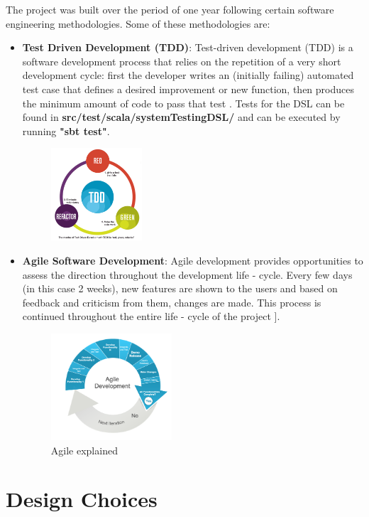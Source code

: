 \documentclass[12pt]{article}
\begin{document}
The project was built over the period of one year following certain software engineering methodologies. Some of these methodologies are:
\begin{itemize}
\item \textbf{Test Driven Development (TDD)}: Test-driven development (TDD) is a software development process that relies on the repetition of a very short development cycle: first the developer writes an (initially failing) automated test case that defines a desired improvement or new function, then produces the minimum amount of code to pass that test \cite{tdd}. Tests for the DSL can be found in \textbf{src/test/scala/systemTestingDSL/} and can be executed by running \textbf{"sbt test"}.

\begin{figure}[H]
  \centering
    \includegraphics[height=130px]{figures/tdd.png}
\end{figure}

\item \textbf{Agile Software Development}: Agile development provides opportunities to assess the direction throughout the development life - cycle. Every few days (in this case 2 weeks), new features are shown to the users and based on feedback and criticism from them, changes are made. This process is continued throughout the entire life - cycle of the project ]\cite{agile}.

\begin{figure}[H]
  \centering
    \includegraphics[height=150px]{figures/agile.png}
  \caption{Agile explained}
\end{figure}
\end{itemize}

\newpage
\section{Design Choices}
\end{document}
